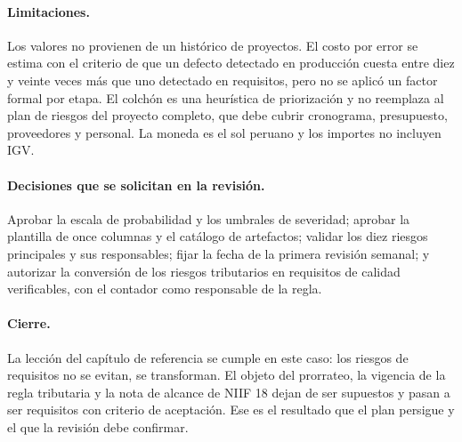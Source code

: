 \paragraph{Limitaciones.} Los valores no provienen de un histórico de
proyectos. El costo por error se estima con el criterio de que un defecto
detectado en producción cuesta entre diez y veinte veces más que uno
detectado en requisitos, pero no se aplicó un factor formal por etapa. El
colchón es una heurística de priorización y no reemplaza al plan de riesgos
del proyecto completo, que debe cubrir cronograma, presupuesto, proveedores
y personal. La moneda es el sol peruano y los importes no incluyen IGV.

\paragraph{Decisiones que se solicitan en la revisión.} Aprobar la escala de
probabilidad y los umbrales de severidad; aprobar la plantilla de once
columnas y el catálogo de artefactos; validar los diez riesgos principales y
sus responsables; fijar la fecha de la primera revisión semanal; y autorizar
la conversión de los riesgos tributarios en requisitos de calidad
verificables, con el contador como responsable de la regla.

\paragraph{Cierre.} La lección del capítulo de referencia se cumple en este
caso: los riesgos de requisitos no se evitan, se transforman. El objeto del
prorrateo, la vigencia de la regla tributaria y la nota de alcance de NIIF 18
dejan de ser supuestos y pasan a ser requisitos con criterio de aceptación.
Ese es el resultado que el plan persigue y el que la revisión debe confirmar.

